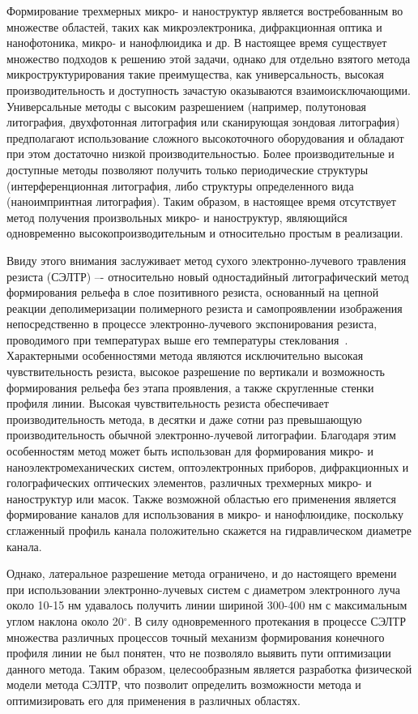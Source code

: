 \actuality


Формирование трехмерных микро- и наноструктур является востребованным во множестве областей, таких как микроэлектроника, дифракционная оптика и нанофотоника, микро- и нанофлюидика и др. В настоящее время существует множество подходов к решению этой задачи, однако для отдельно взятого метода микроструктурирования такие преимущества, как универсальность, высокая производительность и доступность зачастую оказываются взаимоисключающими. Универсальные методы с высоким разрешением (например, полутоновая литография, двухфотонная литография или сканирующая зондовая литография) предполагают использование сложного высокоточного оборудования и обладают при этом достаточно низкой производительностью. Более производительные и доступные методы позволяют получить только периодические структуры (интерференционная литография, либо структуры определенного вида (наноимпринтная литография). Таким образом, в настоящее время отсутствует метод получения произвольных микро- и наноструктур, являющийся одновременно высокопроизводительным и относительно простым в реализации.

Ввиду этого внимания заслуживает метод сухого электронно-лучевого травления резиста (СЭЛТР) –- относительно новый одностадийный литографический метод формирования рельефа в слое позитивного резиста, основанный на цепной реакции деполимеризации полимерного резиста и самопроявлении изображения непосредственно в процессе электронно-лучевого экспонирования резиста, проводимого при температурах выше его температуры стеклования~\cite{Bruk_2016_mee}. Характерными особенностями метода являются исключительно высокая чувствительность резиста, высокое разрешение по вертикали и возможность формирования рельефа без этапа проявления, а также скругленные стенки профиля линии. Высокая чувствительность резиста обеспечивает производительность метода, в десятки и даже сотни раз превышающую производительность обычной электронно-лучевой литографии. Благодаря этим особенностям метод может быть использован для формирования микро- и наноэлектромеханических систем, оптоэлектронных приборов, дифракционных и голографических оптических элементов, различных трехмерных микро- и наноструктур или масок. Также возможной областью его применения является формирование каналов для использования в микро- и нанофлюидике, поскольку сглаженный профиль канала положительно скажется на гидравлическом диаметре канала.

Однако, латеральное разрешение метода ограничено, и до настоящего времени при использовании электронно-лучевых систем с диаметром электронного луча около 10-15 нм удавалось получить линии шириной 300-400 нм с максимальным углом наклона около 20$^\circ$. В силу одновременного протекания в процессе СЭЛТР множества различных процессов точный механизм формирования конечного профиля линии не был понятен, что не позволяло выявить пути оптимизации данного метода. Таким образом, целесообразным является разработка физической модели метода СЭЛТР, что позволит определить возможности метода и оптимизировать его для применения в различных областях.


